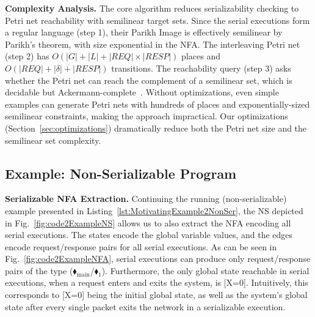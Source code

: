 \medskip
\noindent
\textbf{Complexity Analysis.}
The core algorithm reduces serializability checking to Petri net reachability with semilinear target sets. 
Since the serial executions form a regular language (step 1), their Parikh Image is effectively semilinear by Parikh's theorem, with size exponential in the NFA.
The interleaving Petri net (step 2) has $O(|G| + |L| + |\mathit{REQ}| \times |\mathit{RESP}|)$ places and $O(|\mathit{REQ}| + |\delta| + |\mathit{RESP}|)$ transitions.
The reachability query (step 3) asks whether the Petri net can reach the complement of a semilinear set, which is decidable but Ackermann-complete~\cite{CzWo22}.
Without optimizations, even simple examples can generate Petri nets with hundreds of places and exponentially-sized semilinear constraints, making the approach impractical.
Our optimizations (Section~\ref{sec:optimizations}) dramatically reduce both the Petri net size and the semilinear set complexity.


%


\subsection{Example: Non-Serializable Program}
\label{subsec:ns-not-serializable}

\medskip
\noindent
\textbf{Serializable NFA Extraction.}
%
Continuing the running (non-serializable) example presented in Listing~\ref{lst:MotivatingExample2NonSer}, the NS depicted in Fig.~\ref{fig:code2ExampleNS} allows us to also extract the NFA encoding all serial executions. The states encode the global variable values, and the edges encode request/response pairs for all serial executions. As can be seen in Fig.~\ref{fig:code2ExampleNFA}, serial executions can produce only request/response pairs of the type ({\color{ForestGreen}$\blacklozenge_\text{main}$/{\color{red}$\blacklozenge_1$}}). Furthermore, the only global state reachable in serial executions, when a request enters and exits the system, is [X=0]. 
%
Intuitively, this corresponds to [X=0] being the initial global state, as well as the system's global state after every single packet exits the network in a serializable execution.
%

